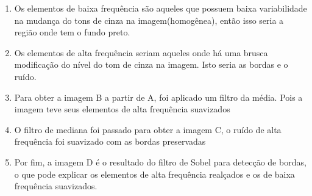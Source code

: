 \begin{question}

    \begin{enumerate}[label=\textbf{\alph*})]
		\item Os elementos de baixa frequência são aqueles que possuem 
		baixa variabilidade na mudança do tons de cinza na imagem(homogênea), então isso seria 
		a região onde tem o fundo preto.
  		\item Os elementos de alta frequência seriam aqueles onde há uma brusca modificação 
        do nível do tom de cinza na imagem. Isto seria as bordas e o ruído.
    	\item Para obter a imagem B a partir de A, foi aplicado um filtro da média. Pois a imagem 
		teve seus elementos de alta frequência suavizados
        \item O filtro de mediana foi passado para obter a imagem C, o ruído de alta frequência foi 
        suavizado com as bordas preservadas
        \item Por fim, a imagem D é o resultado do filtro de Sobel para detecção de bordas, o que 
        pode explicar os elementos de alta frequência realçados e os de baixa frequência suavizados.
	\end{enumerate}
    
\end{question}